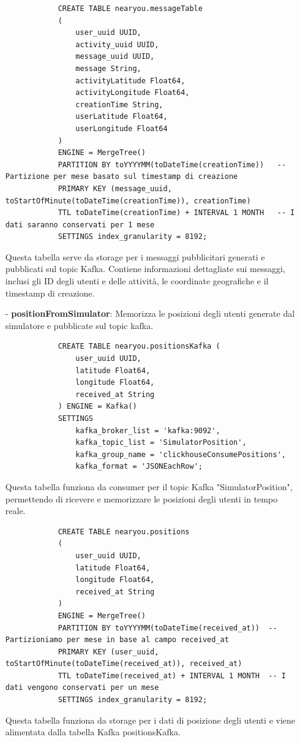 \documentclass[10pt]{article}
\begin{document}
\begin{itemize}
            \begin{lstlisting}
            CREATE TABLE nearyou.messageTable
            (
                user_uuid UUID,
                activity_uuid UUID,
                message_uuid UUID,
                message String,
                activityLatitude Float64,
                activityLongitude Float64,
                creationTime String,
                userLatitude Float64,
                userLongitude Float64
            )
            ENGINE = MergeTree()
            PARTITION BY toYYYYMM(toDateTime(creationTime))   -- Partizione per mese basato sul timestamp di creazione
            PRIMARY KEY (message_uuid, toStartOfMinute(toDateTime(creationTime)), creationTime)
            TTL toDateTime(creationTime) + INTERVAL 1 MONTH   -- I dati saranno conservati per 1 mese
            SETTINGS index_granularity = 8192;
            \end{lstlisting}
            Questa tabella serve da storage per i messaggi pubblicitari generati e pubblicati sul topic Kafka. Contiene informazioni dettagliate sui messaggi, inclusi gli ID degli utenti e delle attività, le coordinate geografiche e il timestamp di creazione.

            \item[-] \textbf{positionFromSimulator}: Memorizza le posizioni degli utenti generate dal simulatore e pubblicate sul topic kafka.
            \begin{lstlisting}
            CREATE TABLE nearyou.positionsKafka (
                user_uuid UUID,
                latitude Float64,
                longitude Float64,
                received_at String
            ) ENGINE = Kafka()
            SETTINGS 
                kafka_broker_list = 'kafka:9092',
                kafka_topic_list = 'SimulatorPosition',
                kafka_group_name = 'clickhouseConsumePositions',
                kafka_format = 'JSONEachRow';
            \end{lstlisting}
            Questa tabella funziona da consumer per il topic Kafka "SimulatorPosition", permettendo di ricevere e memorizzare le posizioni degli utenti in tempo reale.
            
            \begin{lstlisting}
            CREATE TABLE nearyou.positions
            (
                user_uuid UUID,
                latitude Float64,
                longitude Float64,
                received_at String
            )
            ENGINE = MergeTree()
            PARTITION BY toYYYYMM(toDateTime(received_at))  -- Partizioniamo per mese in base al campo received_at
            PRIMARY KEY (user_uuid, toStartOfMinute(toDateTime(received_at)), received_at)
            TTL toDateTime(received_at) + INTERVAL 1 MONTH  -- I dati vengono conservati per un mese
            SETTINGS index_granularity = 8192;
            \end{lstlisting}
            Questa tabella funziona da storage per i dati di posizione degli utenti e viene alimentata dalla tabella Kafka positionsKafka.


\end{itemize}
\end{document}
